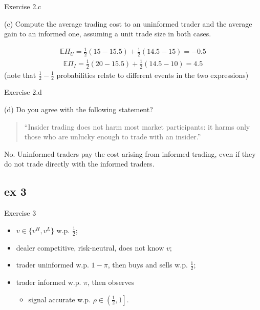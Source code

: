 \documentclass[english,10pt
,aspectratio=169
]{beamer}
\begin{document}
\begin{frame}{Exercise 2.c}
	\begin{exampleblock}{}
		(c) Compute the average trading cost to an uninformed trader and the average gain to an informed one, assuming a unit trade size in both cases.
	\end{exampleblock}
	\pause
	\begin{align*}
		\mathbb{E} \Pi_U = \frac{1}{2} (15-15.5) + \frac{1}{2} (14.5-15) = -0.5
	\end{align*}
	\begin{align*}
		\mathbb{E} \Pi_I = \frac{1}{2} (20 - 15.5) + \frac{1}{2} (14.5 - 10) = 4.5
	\end{align*}
	(note that $\frac{1}{2}-\frac{1}{2}$ probabilities relate to different events in the two expressions)
\end{frame}


\begin{frame}{Exercise 2.d}
	\begin{exampleblock}{}
		(d) Do you agree with the following statement? 
		\begin{quotation}
			\smallskip
			``Insider trading does not harm most market participants: it harms only those who are unlucky enough to trade with an insider.''
		\end{quotation}
	\end{exampleblock}
	\pause
	No. Uninformed traders pay the cost arising from informed trading, even if they do not trade directly with the informed traders.
\end{frame}




\subsection{ex 3}

\begin{frame}{Exercise 3}
	\begin{itemize}
		\item $v \in \{v^H,v^L\}$ w.p. $\frac{1}{2}$;
		\item dealer competitive, risk-neutral, does not know $v$;
		\item trader uninformed w.p. $1-\pi$, then buys and sells w.p. $\frac{1}{2}$;
		\item trader informed w.p. $\pi$, then observes 
		\begin{itemize}
			\item signal accurate w.p. $\rho \in \left(\frac{1}{2},1\right]$.
		\end{itemize}
	\end{itemize}
\end{frame}
\end{document}
